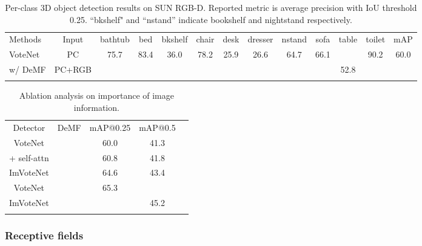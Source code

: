 \documentclass[runningheads]{llncs}
\begin{document}
\setlength{\tabcolsep}{1.2pt}
\begin{table}
\renewcommand\arraystretch{1.75}  \scriptsize
\begin{center}
\caption{Per-class  3D  object  detection  results  on  SUN RGB-D. Reported metric is average precision with IoU threshold 0.25. ``bkshelf" and ``nstand'' indicate bookshelf and nightstand respectively.}
\vspace{6pt}
\label{table:per_class}
\begin{tabular}{lcccccccccccc}
\Xhline{0.8pt}\noalign{\smallskip}
Methods&Input&bathtub&bed&bkshelf&chair&desk&dresser&nstand&sofa&table&toilet&mAP \\
\noalign{\smallskip}
\hline
\noalign{\smallskip}
VoteNet\footnotemark[1] & PC & 75.7 & 83.4 & 36.0 & 78.2 & 25.9 & 26.6 & 64.7 & 66.1 &  & 90.2 & 60.0 \\
w/ DeMF & PC+RGB &  &  &  &  &  &  &  &  & 52.8 &  & \\
\Xhline{0.8pt}
\end{tabular}
\end{center}
\end{table}
\setlength{\tabcolsep}{1.4pt}


\setlength{\tabcolsep}{6pt}
\begin{table}
\begin{center}
\vspace{-15pt}
\caption{Ablation analysis on importance of image information.}
\vspace{6pt}
\label{table:ImVoteNet}
\begin{tabular}{ccccc}
\Xhline{0.8pt}\noalign{\smallskip}
Detector & DeMF &mAP@0.25  & mAP@0.5 \\
\noalign{\smallskip}
\hline
\noalign{\smallskip}
VoteNet & & 60.0 & 41.3\\
+ self-attn &  & 60.8 & 41.8\\ 
ImVoteNet & & 64.6 & 43.4 \\
\hline
VoteNet  &  & 65.3 &  \\
ImVoteNet &  &  & 45.2 \\
\Xhline{0.8pt}
\end{tabular}
\end{center}
\end{table}
\setlength{\tabcolsep}{1.4pt}


\subsubsection{Receptive fields}
\end{document}
